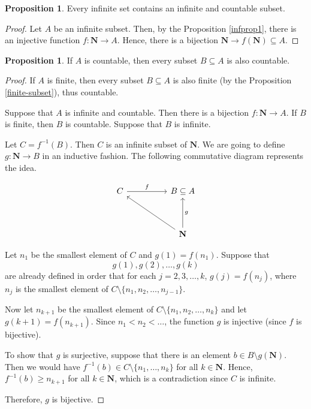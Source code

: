 \documentclass[12pt,a4paper]{article}
\theoremstyle{definition}
\newtheorem{proposition}[theorem]{Proposition}
\begin{document}
\begin{proposition}\label{propcount1}
	Every infinite set contains an infinite and countable subset.
\end{proposition}

\begin{proof}
	Let $A$ be an infinite subset. Then, by the Proposition \ref{infprop1}, there is an injective function $f : \textbf{N} \longrightarrow A$. Hence, there is a bijection $\textbf{N} \longrightarrow f(\textbf{N}) \subseteq A$.
\end{proof}

\begin{proposition}\label{propcount2}
	If $A$ is countable, then every subset $B \subseteq A$ is also countable.
\end{proposition}

\begin{proof}
	If $A$ is finite, then every subset $B \subseteq A$ is also finite (by the Proposition \ref{finite-subset}), thus countable.
	
	Suppose that $A$ is infinite and countable. Then there is a bijection $f : \textbf{N} \longrightarrow A$. If $B$ is finite, then $B$ is countable. Suppose that $B$ is infinite.
	
	Let $C = f^{-1}(B)$. Then $C$ is an infinite subset of $\textbf{N}$. We are going to define $g : \textbf{N} \longrightarrow B$ in an inductive fashion. The following commutative diagram represents the idea.
	
\[\begin{tikzcd}
	C && {B \subseteq A} \\
	\\
	&& {\textbf{N}}
	\arrow["g"', from=3-3, to=1-3]
	\arrow["f", from=1-1, to=1-3]
	\arrow[from=3-3, to=1-1]
\end{tikzcd}\]

	Let $n_1$ be the smallest element of $C$ and $g(1) = f(n_1)$. Suppose that \[ g(1), g(2), \ldots, g(k) \] are already defined in order that for each $j = 2, 3, \ldots, k$, $g(j) = f(n_j)$, where $n_j$ is the smallest element of $C \setminus \{n_1, n_2, \ldots, n_{j-1} \}$.
	
	Now let $n_{k+1}$ be the smallest element of $C \setminus \{n_1, n_2, \ldots, n_k \}$ and let $g(k+1) = f(n_{k+1})$. Since $n_1 < n_2 < \ldots$, the function $g$ is injective (since $f$ is bijective).
	
	To show that $g$ is surjective, suppose that there is an element $b \in B \setminus g(\textbf{N})$. Then we would have $f^{-1}(b) \in C \setminus \{ n_1, \ldots, n_k \}$ for all $k \in \textbf{N}$. Hence, $f^{-1}(b) \geq n_{k+1}$ for all $k \in \textbf{N}$, which is a contradiction since $C$ is infinite.
	
	Therefore, $g$ is bijective.
	
\end{proof}
\end{document}
